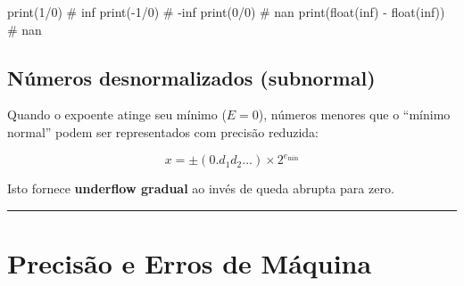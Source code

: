\documentclass[
  11pt,
  letterpaper,
  DIV=11,
  numbers=noendperiod]{scrartcl}
\newenvironment{Shaded}{\begin{snugshade}}{\end{snugshade}}
\newcommand{\BuiltInTok}[1]{\textcolor[rgb]{0.00,0.23,0.31}{#1}}
\newcommand{\CommentTok}[1]{\textcolor[rgb]{0.37,0.37,0.37}{#1}}
\newcommand{\DecValTok}[1]{\textcolor[rgb]{0.68,0.00,0.00}{#1}}
\newcommand{\NormalTok}[1]{\textcolor[rgb]{0.00,0.23,0.31}{#1}}
\newcommand{\OperatorTok}[1]{\textcolor[rgb]{0.37,0.37,0.37}{#1}}
\newcommand{\StringTok}[1]{\textcolor[rgb]{0.13,0.47,0.30}{#1}}
\begin{document}
\begin{tcolorbox}[enhanced jigsaw, arc=.35mm, bottomrule=.15mm, bottomtitle=1mm, breakable, colback=white, colbacktitle=quarto-callout-tip-color!10!white, colframe=quarto-callout-tip-color-frame, coltitle=black, left=2mm, leftrule=.75mm, opacityback=0, opacitybacktitle=0.6, rightrule=.15mm, title=\textcolor{quarto-callout-tip-color}{\faLightbulb}\hspace{0.5em}{Exemplos de operações especiais}, titlerule=0mm, toprule=.15mm, toptitle=1mm]

\begin{Shaded}
\begin{Highlighting}[]
\BuiltInTok{print}\NormalTok{(}\DecValTok{1}\OperatorTok{/}\DecValTok{0}\NormalTok{)          }\CommentTok{\# inf}
\BuiltInTok{print}\NormalTok{(}\OperatorTok{{-}}\DecValTok{1}\OperatorTok{/}\DecValTok{0}\NormalTok{)         }\CommentTok{\# {-}inf}
\BuiltInTok{print}\NormalTok{(}\DecValTok{0}\OperatorTok{/}\DecValTok{0}\NormalTok{)          }\CommentTok{\# nan}
\BuiltInTok{print}\NormalTok{(}\BuiltInTok{float}\NormalTok{(}\StringTok{\textquotesingle{}inf\textquotesingle{}}\NormalTok{) }\OperatorTok{{-}} \BuiltInTok{float}\NormalTok{(}\StringTok{\textquotesingle{}inf\textquotesingle{}}\NormalTok{))  }\CommentTok{\# nan}
\end{Highlighting}
\end{Shaded}

\end{tcolorbox}

\subsection{Números desnormalizados
(subnormal)}\label{nuxfameros-desnormalizados-subnormal}

Quando o expoente atinge seu mínimo (\(E = 0\)), números menores que o
``mínimo normal'' podem ser representados com precisão reduzida:

\[x = \pm (0.d_1 d_2 \ldots) \times 2^{e_{\text{min}}}\]

Isto fornece \textbf{underflow gradual} ao invés de queda abrupta para
zero.

\begin{center}\rule{0.5\linewidth}{0.5pt}\end{center}

\section{Precisão e Erros de
Máquina}\label{precisuxe3o-e-erros-de-muxe1quina}
\end{document}
